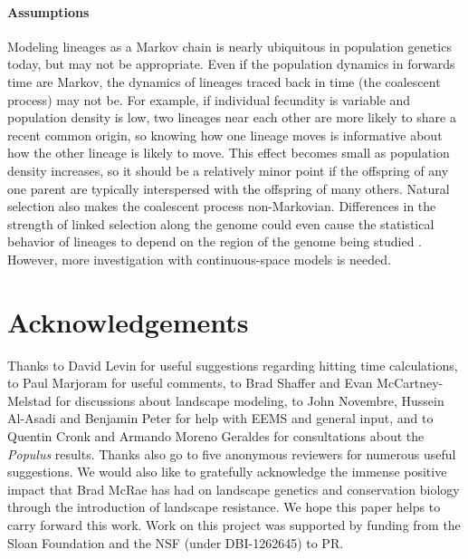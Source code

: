 \documentclass{article}
\newif\ifsubmission
\begin{document}
\paragraph{Assumptions}
Modeling lineages as a Markov chain is nearly ubiquitous in population genetics today,
but may not be appropriate.
Even if the population dynamics in forwards time are Markov, 
the dynamics of lineages traced back in time (the coalescent process) may not be. 
For example, if individual fecundity is variable and population density is low,  
two lineages near each other are more likely to share a recent common origin, 
so knowing how one lineage moves is informative about how the other lineage is likely to move. 
This effect becomes small as population density increases, 
so it should be a relatively minor point if the offspring
of any one parent are typically interspersed with the offspring of many others. 
Natural selection also makes the coalescent process non-Markovian.
Differences in the strength of linked selection along the genome
could even cause the statistical behavior of lineages to depend
on the region of the genome being studied \citep{wang2014isolation,li2016local}.
However, more investigation with continuous-space models is needed.



\section*{Acknowledgements}

Thanks to David Levin for useful suggestions regarding hitting time calculations,
to Paul Marjoram for useful comments,
to Brad Shaffer and Evan McCartney-Melstad for discussions about landscape modeling,
to John Novembre, Hussein Al-Asadi and Benjamin Peter for help with EEMS
and general input,
and to Quentin Cronk and Armando Moreno Geraldes for consultations about the \emph{Populus} results.
Thanks also go to five anonymous reviewers for numerous useful suggestions.
We would also like to gratefully acknowledge the immense positive impact that Brad McRae \citep[1966--2017;][]{lawler2018tribute}
has had on landscape genetics and conservation biology through the introduction of landscape resistance.
We hope this paper helps to carry forward this work.
Work on this project was supported by funding from
the Sloan Foundation and the NSF (under DBI-1262645) to PR.




\ifsubmission
\processdelayedfloats
\fi
\end{document}
